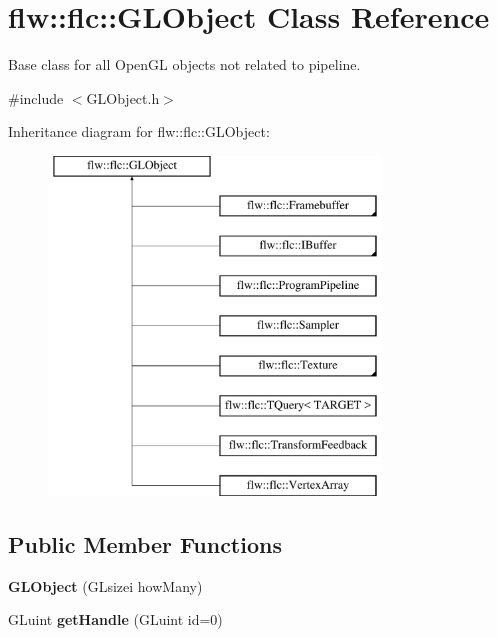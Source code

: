 \hypertarget{classflw_1_1flc_1_1GLObject}{}\section{flw\+:\+:flc\+:\+:G\+L\+Object Class Reference}
\label{classflw_1_1flc_1_1GLObject}


Base class for all Open\+GL objects not related to pipeline.  




{\ttfamily \#include $<$G\+L\+Object.\+h$>$}

Inheritance diagram for flw\+:\+:flc\+:\+:G\+L\+Object\+:\begin{figure}[H]
\begin{center}
\leavevmode
\includegraphics[height=9.000000cm]{classflw_1_1flc_1_1GLObject}
\end{center}
\end{figure}
\subsection*{Public Member Functions}
\begin{DoxyCompactItemize}
\item 
{\bfseries G\+L\+Object} (G\+Lsizei how\+Many)\hypertarget{classflw_1_1flc_1_1GLObject_aec8d37982901c84d58f9319c863d0e24}{}\label{classflw_1_1flc_1_1GLObject_aec8d37982901c84d58f9319c863d0e24}

\item 
G\+Luint {\bfseries get\+Handle} (G\+Luint id=0)\hypertarget{classflw_1_1flc_1_1GLObject_ac23c3ec039eccfbed64799352df3dbce}{}\label{classflw_1_1flc_1_1GLObject_ac23c3ec039eccfbed64799352df3dbce}

\end{DoxyCompactItemize}
